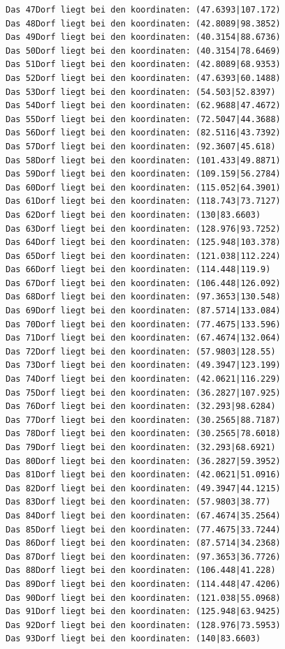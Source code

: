 \documentclass{article}
\begin{document}
\begin{verbatim}
Das 47Dorf liegt bei den koordinaten: (47.6393|107.172)
Das 48Dorf liegt bei den koordinaten: (42.8089|98.3852)
Das 49Dorf liegt bei den koordinaten: (40.3154|88.6736)
Das 50Dorf liegt bei den koordinaten: (40.3154|78.6469)
Das 51Dorf liegt bei den koordinaten: (42.8089|68.9353)
Das 52Dorf liegt bei den koordinaten: (47.6393|60.1488)
Das 53Dorf liegt bei den koordinaten: (54.503|52.8397)
Das 54Dorf liegt bei den koordinaten: (62.9688|47.4672)
Das 55Dorf liegt bei den koordinaten: (72.5047|44.3688)
Das 56Dorf liegt bei den koordinaten: (82.5116|43.7392)
Das 57Dorf liegt bei den koordinaten: (92.3607|45.618)
Das 58Dorf liegt bei den koordinaten: (101.433|49.8871)
Das 59Dorf liegt bei den koordinaten: (109.159|56.2784)
Das 60Dorf liegt bei den koordinaten: (115.052|64.3901)
Das 61Dorf liegt bei den koordinaten: (118.743|73.7127)
Das 62Dorf liegt bei den koordinaten: (130|83.6603)
Das 63Dorf liegt bei den koordinaten: (128.976|93.7252)
Das 64Dorf liegt bei den koordinaten: (125.948|103.378)
Das 65Dorf liegt bei den koordinaten: (121.038|112.224)
Das 66Dorf liegt bei den koordinaten: (114.448|119.9)
Das 67Dorf liegt bei den koordinaten: (106.448|126.092)
Das 68Dorf liegt bei den koordinaten: (97.3653|130.548)
Das 69Dorf liegt bei den koordinaten: (87.5714|133.084)
Das 70Dorf liegt bei den koordinaten: (77.4675|133.596)
Das 71Dorf liegt bei den koordinaten: (67.4674|132.064)
Das 72Dorf liegt bei den koordinaten: (57.9803|128.55)
Das 73Dorf liegt bei den koordinaten: (49.3947|123.199)
Das 74Dorf liegt bei den koordinaten: (42.0621|116.229)
Das 75Dorf liegt bei den koordinaten: (36.2827|107.925)
Das 76Dorf liegt bei den koordinaten: (32.293|98.6284)
Das 77Dorf liegt bei den koordinaten: (30.2565|88.7187)
Das 78Dorf liegt bei den koordinaten: (30.2565|78.6018)
Das 79Dorf liegt bei den koordinaten: (32.293|68.6921)
Das 80Dorf liegt bei den koordinaten: (36.2827|59.3952)
Das 81Dorf liegt bei den koordinaten: (42.0621|51.0916)
Das 82Dorf liegt bei den koordinaten: (49.3947|44.1215)
Das 83Dorf liegt bei den koordinaten: (57.9803|38.77)
Das 84Dorf liegt bei den koordinaten: (67.4674|35.2564)
Das 85Dorf liegt bei den koordinaten: (77.4675|33.7244)
Das 86Dorf liegt bei den koordinaten: (87.5714|34.2368)
Das 87Dorf liegt bei den koordinaten: (97.3653|36.7726)
Das 88Dorf liegt bei den koordinaten: (106.448|41.228)
Das 89Dorf liegt bei den koordinaten: (114.448|47.4206)
Das 90Dorf liegt bei den koordinaten: (121.038|55.0968)
Das 91Dorf liegt bei den koordinaten: (125.948|63.9425)
Das 92Dorf liegt bei den koordinaten: (128.976|73.5953)
Das 93Dorf liegt bei den koordinaten: (140|83.6603)

\end{verbatim}
\end{document}
